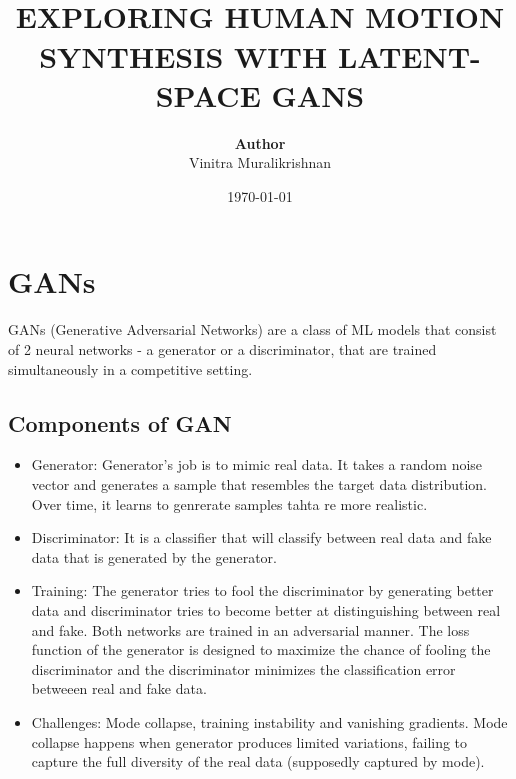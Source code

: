 \documentclass{article}
\begin{document}
\title{ \normalsize \textsc{}
		\\ [2.0cm]
		\LARGE \textbf{\uppercase{Exploring Human Motion Synthesis with Latent-Space GANs}
        }
		}
\date{\today}

\author{\textbf{Author} \\ 
		Vinitra Muralikrishnan}

{\let\newpage\relax\maketitle}
\tableofcontents
\newpage

\section{GANs}
GANs (Generative Adversarial Networks) are a class of ML models that consist of 2 neural networks -
a generator or a discriminator, that are trained simultaneously in a competitive setting.\\

\subsection{Components of GAN}
\begin{itemize}
\item Generator: Generator's job is to mimic real data. It takes a random noise vector and generates a sample
that resembles the target data distribution. Over time, it learns to genrerate samples tahta re more realistic.
\item Discriminator: It is a classifier that will classify between real data and fake data that is generated by the generator.
\item Training: The generator tries to fool the discriminator by generating better data and discriminator tries to become
better at distinguishing between real and fake. Both networks are trained in an adversarial manner. The loss function
of the generator is designed to maximize the chance of fooling the discriminator and the discriminator minimizes the classification
error betweeen real and fake data.
\item Challenges: Mode collapse, training instability and vanishing gradients. Mode collapse happens when generator produces
limited variations, failing to capture the full diversity of the real data (supposedly captured by mode).

\end{itemize}
\end{document}
